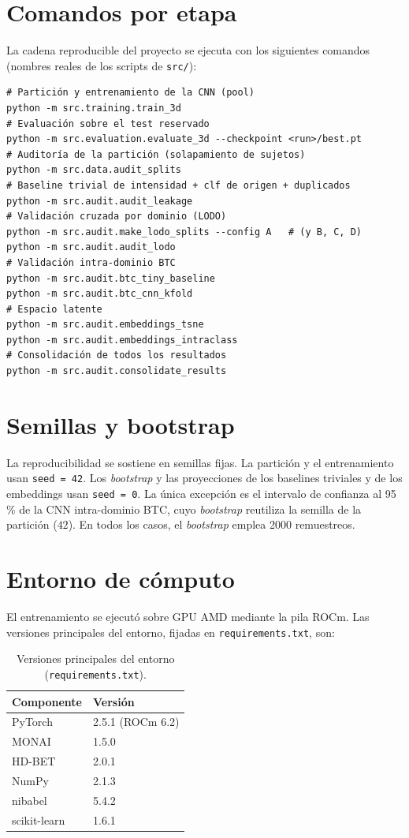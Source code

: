 \section{Comandos por etapa}

La cadena reproducible del proyecto se ejecuta con los siguientes comandos
(nombres reales de los scripts de \texttt{src/}):

\begin{verbatim}
# Partición y entrenamiento de la CNN (pool)
python -m src.training.train_3d
# Evaluación sobre el test reservado
python -m src.evaluation.evaluate_3d --checkpoint <run>/best.pt
# Auditoría de la partición (solapamiento de sujetos)
python -m src.data.audit_splits
# Baseline trivial de intensidad + clf de origen + duplicados
python -m src.audit.audit_leakage
# Validación cruzada por dominio (LODO)
python -m src.audit.make_lodo_splits --config A   # (y B, C, D)
python -m src.audit.audit_lodo
# Validación intra-dominio BTC
python -m src.audit.btc_tiny_baseline
python -m src.audit.btc_cnn_kfold
# Espacio latente
python -m src.audit.embeddings_tsne
python -m src.audit.embeddings_intraclass
# Consolidación de todos los resultados
python -m src.audit.consolidate_results
\end{verbatim}

\section{Semillas y bootstrap}

La reproducibilidad se sostiene en semillas fijas. La partición y el entrenamiento
usan \texttt{seed = 42}. Los \emph{bootstrap} y las proyecciones de los baselines
triviales y de los embeddings usan \texttt{seed = 0}. La única excepción es el
intervalo de confianza al 95\,\% de la CNN intra-dominio BTC, cuyo \emph{bootstrap}
reutiliza la semilla de la partición ($42$). En todos los casos, el \emph{bootstrap}
emplea 2000 remuestreos.

\section{Entorno de cómputo}

El entrenamiento se ejecutó sobre GPU AMD mediante la pila ROCm. Las versiones
principales del entorno, fijadas en \texttt{requirements.txt}, son:

\begin{table}[ht]
  \centering
  \caption[Entorno de cómputo]{Versiones principales del entorno
  (\texttt{requirements.txt}).}
  \label{tab:apx_env}
  \begin{tabular}{l l}
    \hline
    \textbf{Componente} & \textbf{Versión} \\
    \hline
    PyTorch       & 2.5.1 (ROCm 6.2) \\
    MONAI         & 1.5.0 \\
    HD-BET        & 2.0.1 \\
    NumPy         & 2.1.3 \\
    nibabel       & 5.4.2 \\
    scikit-learn  & 1.6.1 \\
    \hline
  \end{tabular}
\end{table}

